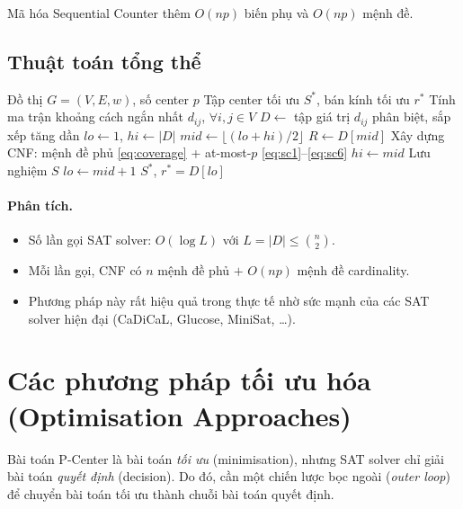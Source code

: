 \documentclass[11pt,a4paper]{article}
\begin{document}
Mã hóa Sequential Counter thêm $O(np)$ biến phụ và $O(np)$ mệnh đề.

\subsection{Thuật toán tổng thể}

\begin{algorithm}[h]
\caption{Giải P-Center bằng SAT}
\label{alg:sat_pcenter}
\begin{algorithmic}[1]
\Require Đồ thị $G=(V,E,w)$, số center $p$
\Ensure Tập center tối ưu $S^*$, bán kính tối ưu $r^*$
\State Tính ma trận khoảng cách ngắn nhất $d_{ij}$, $\forall i,j \in V$
\State $D \gets$ tập giá trị $d_{ij}$ phân biệt, sắp xếp tăng dần
\State $lo \gets 1$, $hi \gets |D|$
    \State $mid \gets \lfloor (lo + hi) / 2 \rfloor$
    \State $R \gets D[mid]$
    \State Xây dựng CNF: mệnh đề phủ \eqref{eq:coverage} + at-most-$p$ \eqref{eq:sc1}--\eqref{eq:sc6}
        \State $hi \gets mid$
        \State Lưu nghiệm $S$
    \Else
        \State $lo \gets mid + 1$
    \EndIf
\EndWhile
\State \Return $S^*$, $r^* = D[lo]$
\end{algorithmic}
\end{algorithm}

\paragraph{Phân tích.}
\begin{itemize}[nosep]
    \item Số lần gọi SAT solver: $O(\log L)$ với $L = |D| \le \binom{n}{2}$.
    \item Mỗi lần gọi, CNF có $n$ mệnh đề phủ $+$ $O(np)$ mệnh đề cardinality.
    \item Phương pháp này rất hiệu quả trong thực tế nhờ sức mạnh của các SAT solver hiện đại (CaDiCaL, Glucose, MiniSat, \ldots).
\end{itemize}


\section{Các phương pháp tối ưu hóa (Optimisation Approaches)}
\label{sec:optimisation}

Bài toán P-Center là bài toán \emph{tối ưu} (minimisation), nhưng SAT solver chỉ giải bài toán \emph{quyết định} (decision).
Do đó, cần một chiến lược bọc ngoài (\textit{outer loop}) để chuyển bài toán tối ưu thành chuỗi bài toán quyết định.
\end{document}
